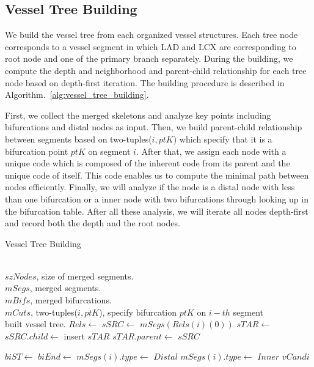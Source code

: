 \documentclass[journal]{IEEEtran}
\begin{document}
\subsection{Vessel Tree Building}
\label{subsec:vessel-tree-building}
We build the vessel tree from each organized vessel structures. Each tree node corresponds to a vessel segment in which LAD and LCX are corresponding to root node and one of the primary branch separately. During the building, we compute the depth and neighborhood and parent-child relationship for each tree node based on depth-first iteration. The building procedure is described in Algorithm.~\ref{alg:vessel_tree_building}.

First, we collect the merged skeletons and analyze key points including bifurcations and distal nodes as input. Then, we build parent-child relationship between segments based on two-tuples($i,ptK$) which specify that it is a bifurcation point $ptK$ on segment $i$. After that, we assign each node with a unique code which is composed of the inherent code from its parent and the unique code of itself. This code enables us to compute the minimal path between nodes efficiently. Finally, we will analyze if the node is a distal node with less than one bifurcation or a inner node with two bifurcations through looking up in the bifurcation table. After all these analysis, we will iterate all nodes depth-first and record both the depth and the root nodes.

\begin{algorithm}
  \caption{Vessel Tree Building}
  \label{alg:vessel_tree_building}
  \renewcommand{\algorithmicrequire}{\textbf{Input:}}
  \renewcommand{\algorithmicensure}{\textbf{Output:}}
  \begin{algorithmic}[]
  \Require ~~\\
    $szNodes$, size of merged segments.\\
    $mSegs$, merged segments.\\
    $mBifs$, merged bifurcations. \\
    $mCuts$, two-tuples($i,ptK$), specify bifurcation $ptK$ on $i-th$ segment
  \Ensure ~~\\
    built vessel tree.
  \State
    \State $Rels \gets$ 
      \State $sSRC \gets$ $mSegs(Rels(i)(0))$
      \State $sTAR \gets$ 
      \State $sSRC.child \gets$ insert $sTAR$
      \State $sTAR.parent \gets$ $sSRC$
    \EndFor

      \State $biST \gets$ 
      \State $biEnd \gets$ 
        \State $mSegs(i).type \gets$ $Distal$
      \Else
        \State $mSegs(i).type \gets$ $Inner$
      \EndIf
    \EndFor
    \State \Return $vCandi$
  \EndFunction
  \State
  \end{algorithmic}
\end{algorithm}
\end{document}
